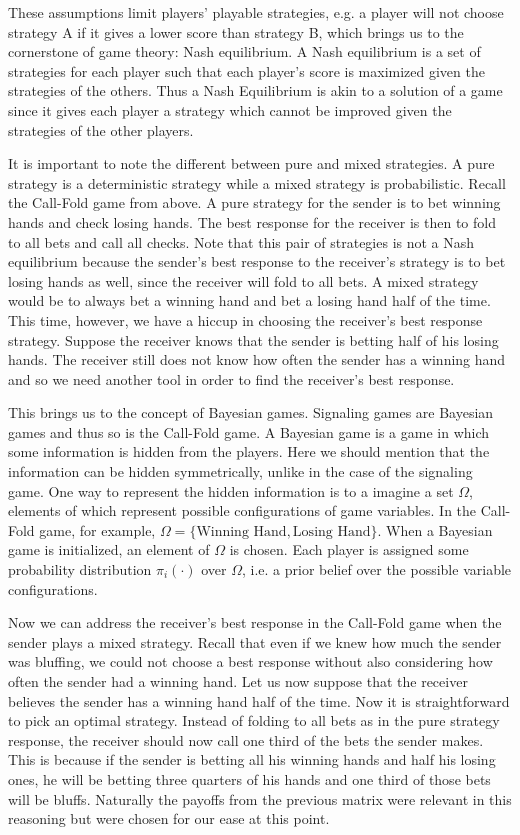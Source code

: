 \documentclass{article}
\begin{document}
These assumptions limit players' playable strategies, e.g. a player will not choose strategy A if it gives a lower score than strategy B, which brings us to the cornerstone of game theory: Nash equilibrium. A Nash equilibrium is a set of strategies for each player such that each player's score is maximized given the strategies of the others. Thus a Nash Equilibrium is akin to a solution of a game since it gives each player a strategy which cannot be improved given the strategies of the other players.

It is important to note the different between pure and mixed strategies. A pure strategy is a deterministic strategy while a mixed strategy is probabilistic. Recall the Call-Fold game from above. A pure strategy for the sender is to bet winning hands and check losing hands. The best response for the receiver is then to fold to all bets and call all checks. Note that this pair of strategies is not a Nash equilibrium because the sender's best response to the receiver's strategy is to bet losing hands as well, since the receiver will fold to all bets. A mixed strategy would be to always bet a winning hand and bet a losing hand half of the time. This time, however, we have a hiccup in choosing the receiver's best response strategy. Suppose the receiver knows that the sender is betting half of his losing hands. The receiver still does not know how often the sender has a winning hand and so we need another tool in order to find the receiver's best response.

This brings us to the concept of Bayesian games. Signaling games are Bayesian games and thus so is the Call-Fold game. A Bayesian game is a game in which some information is hidden from the players. Here we should mention that the information can be hidden symmetrically, unlike in the case of the signaling game. One way to represent the hidden information is to a imagine a set $\Omega$, elements of which represent possible configurations of game variables. In the Call-Fold game, for example, $\Omega = \{\text{Winning Hand}, \text{Losing Hand}\}$. When a Bayesian game is initialized, an element of $\Omega$ is chosen. Each player is assigned some probability distribution $\pi_{i}(\cdot)$ over $\Omega$, i.e. a prior belief over the possible variable configurations.

Now we can address the receiver's best response in the Call-Fold game when the sender plays a mixed strategy. Recall that even if we knew how much the sender was bluffing, we could not choose a best response without also considering how often the sender had a winning hand. Let us now suppose that the receiver believes the sender has a winning hand half of the time. Now it is straightforward to pick an optimal strategy. Instead of folding to all bets as in the pure strategy response, the receiver should now call one third of the bets the sender makes. This is because if the sender is betting all his winning hands and half his losing ones, he will be betting three quarters of his hands and one third of those bets will be bluffs. Naturally the payoffs from the previous matrix were relevant in this reasoning but were chosen for our ease at this point.
\end{document}
